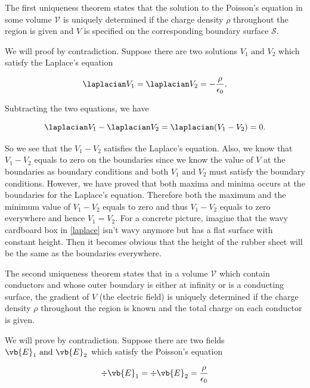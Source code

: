 \documentclass[a4paper,12pt]{report}
\begin{document}
	The first uniqueness theorem states that the solution to the Poisson's equation in some volume \(\mathcal{V} \) is uniquely determined if the charge density \(\rho \) throughout the region is given and \(V\) is specified on the corresponding boundary surface \(\mathcal{S} \).  
	
	We will proof by contradiction. Suppose there are two solutions \(V_1 \text{ and } V_2\) which satisfy the Laplace's equation
	
	\begin{equation}
		\laplacian V_1 = \laplacian V_2 = -\frac{\rho }{\epsilon_0} .
	\end{equation}
	
	Subtracting the two equations, we have 
	
	\begin{equation}
		\laplacian V_1 - \laplacian V_2 = \laplacian (V_1 - V_2) = 0.
	\end{equation}
	
	So we see that the \(V_1 - V_2\) satisfies the Laplace's equation. Also, we know that \(V_1 - V_2\) equals to zero on the boundaries since we know the value of \(V\) at the boundaries as boundary conditions and both \(V_1 \text{ and }  V_2\) must satisfy the boundary conditions. However, we have proved that both maxima and minima occurs at the boundaries for the Laplace's equation. Therefore both the maximum and the minimum value of \(V_1 - V_2\) equals to zero and thus \(V_1 - V_2\) equals to zero everywhere and hence \(V_1 = V_2\). For a concrete picture, imagine that the wavy cardboard box in \cref{laplace} isn't wavy anymore but has a flat surface with constant height. Then it becomes obvious that the height of the rubber sheet will be the same as the boundaries everywhere.
	
	The second uniqueness theorem states that in a volume \(\mathcal{V} \) which contain conductors and whose outer boundary is either at infinity or is a conducting surface, the gradient of \(V\) (\ie the electric field) is uniquely determined if the charge density \(\rho \) throughout the region is known and the total charge on each conductor is given.  
	
	We will prove by contradiction. Suppose there are two fields \(\vb{E} _{1} \text{ and } \vb{E} _{2} \) which satisfy the Poisson's equation
	
	\begin{equation}
		\div{\vb{E} _{1} } = \div{\vb{E} _{2} } = \frac{\rho }{\epsilon_0}
	\end{equation}
	
\end{document}
